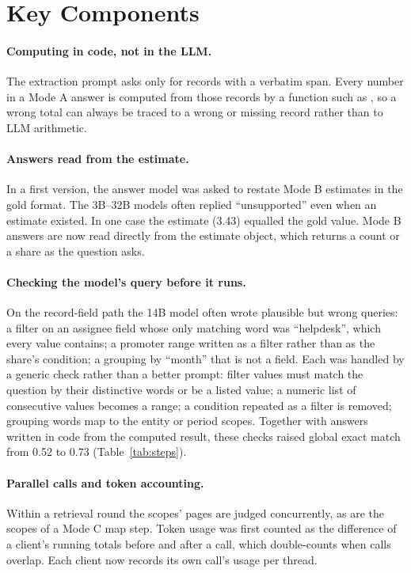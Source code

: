 \documentclass[11pt,letterpaper,oneside]{report}
\begin{document}
\section{Key Components}
\label{sec:components}

\paragraph{Computing in code, not in the LLM.}
The extraction prompt asks only for records with a verbatim span. Every
number in a Mode A answer is computed from those records by a function such
as , so a wrong total can always be traced to a
wrong or missing record rather than to LLM arithmetic.

\paragraph{Answers read from the estimate.}
In a first version, the answer model was asked to restate Mode B estimates in
the gold format. The 3B--32B models often replied ``unsupported'' even when
an estimate existed. In one case the estimate (3.43) equalled the gold value.
Mode B answers are now read directly from the estimate object, which returns
a count or a share as the question asks.

\paragraph{Checking the model's query before it runs.}
On the record-field path the 14B model often wrote plausible but wrong
queries: a filter on an assignee field whose only matching word was
``helpdesk'', which every value contains; a promoter range written as a
filter rather than as the share's condition; a grouping by ``month'' that
is not a field. Each was handled by a generic check rather than a better
prompt: filter values must match the question by their distinctive words or
be a listed value; a numeric list of consecutive values becomes a range; a
condition repeated as a filter is removed; grouping words map to the entity
or period scopes. Together with answers written in code from the computed
result, these checks raised global exact match from 0.52 to 0.73
(Table~\ref{tab:steps}).

\paragraph{Parallel calls and token accounting.}
Within a retrieval round the scopes' pages are judged concurrently, as are
the scopes of a Mode C map step. Token usage was first counted as the
difference of a client's running totals before and after a call, which
double-counts when calls overlap. Each client now records its own call's
usage per thread.
\end{document}
